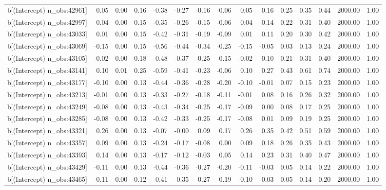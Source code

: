 \begin{table}[ht]
\begin{tabular}{rrrrrrrrrrrrrrr}
  b[(Intercept) n\_obs:42961] & 0.05 & 0.00 & 0.16 & -0.38 & -0.27 & -0.16 & -0.06 & 0.05 & 0.16 & 0.25 & 0.35 & 0.44 & 2000.00 & 1.00 \\ 
  b[(Intercept) n\_obs:42997] & 0.04 & 0.00 & 0.15 & -0.35 & -0.26 & -0.15 & -0.06 & 0.04 & 0.14 & 0.22 & 0.31 & 0.40 & 2000.00 & 1.00 \\ 
  b[(Intercept) n\_obs:43033] & 0.01 & 0.00 & 0.15 & -0.42 & -0.31 & -0.19 & -0.09 & 0.01 & 0.11 & 0.20 & 0.30 & 0.42 & 2000.00 & 1.00 \\ 
  b[(Intercept) n\_obs:43069] & -0.15 & 0.00 & 0.15 & -0.56 & -0.44 & -0.34 & -0.25 & -0.15 & -0.05 & 0.03 & 0.13 & 0.24 & 2000.00 & 1.00 \\ 
  b[(Intercept) n\_obs:43105] & -0.02 & 0.00 & 0.18 & -0.48 & -0.37 & -0.25 & -0.15 & -0.02 & 0.10 & 0.21 & 0.31 & 0.40 & 2000.00 & 1.00 \\ 
  b[(Intercept) n\_obs:43141] & 0.10 & 0.01 & 0.25 & -0.59 & -0.41 & -0.23 & -0.06 & 0.10 & 0.27 & 0.43 & 0.61 & 0.74 & 2000.00 & 1.00 \\ 
  b[(Intercept) n\_obs:43177] & -0.10 & 0.00 & 0.13 & -0.44 & -0.36 & -0.28 & -0.20 & -0.10 & -0.01 & 0.07 & 0.15 & 0.23 & 2000.00 & 1.00 \\ 
  b[(Intercept) n\_obs:43213] & -0.01 & 0.00 & 0.13 & -0.33 & -0.27 & -0.18 & -0.11 & -0.01 & 0.08 & 0.16 & 0.26 & 0.32 & 2000.00 & 1.00 \\ 
  b[(Intercept) n\_obs:43249] & -0.08 & 0.00 & 0.13 & -0.43 & -0.34 & -0.25 & -0.17 & -0.09 & 0.00 & 0.08 & 0.17 & 0.25 & 2000.00 & 1.00 \\ 
  b[(Intercept) n\_obs:43285] & -0.08 & 0.00 & 0.13 & -0.42 & -0.33 & -0.25 & -0.17 & -0.08 & 0.01 & 0.09 & 0.19 & 0.25 & 2000.00 & 1.00 \\ 
  b[(Intercept) n\_obs:43321] & 0.26 & 0.00 & 0.13 & -0.07 & -0.00 & 0.09 & 0.17 & 0.26 & 0.35 & 0.42 & 0.51 & 0.59 & 2000.00 & 1.00 \\ 
  b[(Intercept) n\_obs:43357] & 0.09 & 0.00 & 0.13 & -0.24 & -0.17 & -0.08 & 0.00 & 0.09 & 0.18 & 0.26 & 0.35 & 0.43 & 2000.00 & 1.00 \\ 
  b[(Intercept) n\_obs:43393] & 0.14 & 0.00 & 0.13 & -0.17 & -0.12 & -0.03 & 0.05 & 0.14 & 0.23 & 0.31 & 0.40 & 0.47 & 2000.00 & 1.00 \\ 
  b[(Intercept) n\_obs:43429] & -0.11 & 0.00 & 0.13 & -0.44 & -0.36 & -0.27 & -0.20 & -0.11 & -0.03 & 0.05 & 0.14 & 0.22 & 2000.00 & 1.00 \\ 
  b[(Intercept) n\_obs:43465] & -0.11 & 0.00 & 0.12 & -0.41 & -0.35 & -0.27 & -0.19 & -0.10 & -0.03 & 0.05 & 0.14 & 0.20 & 2000.00 & 1.00 \\ 

\end{tabular}
\end{table}
